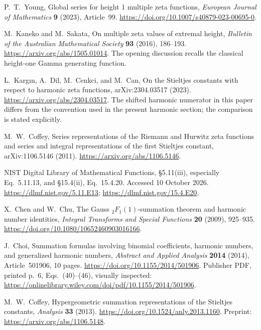 P.~T.~Young,
Global series for height 1 multiple zeta functions,
\emph{European Journal of Mathematics} \textbf{9} (2023), Article~99.
\url{https://doi.org/10.1007/s40879-023-00695-0}.

M.~Kaneko and M.~Sakata,
On multiple zeta values of extremal height,
\emph{Bulletin of the Australian Mathematical Society}
\textbf{93} (2016), 186--193.
\url{https://arxiv.org/abs/1505.01014}.
The opening discussion recalls the classical height-one Gamma
generating function.

L.~Karg\i n, A.~Dil, M.~Cenkci, and M.~Can,
On the Stieltjes constants with respect to harmonic zeta functions,
arXiv:2304.03517 (2023).
\url{https://arxiv.org/abs/2304.03517}.
The shifted harmonic numerator in this paper differs from the convention
used in the present harmonic section; the comparison is stated explicitly.

M.~W.~Coffey,
Series representations of the Riemann and Hurwitz zeta functions and
series and integral representations of the first Stieltjes constant,
arXiv:1106.5146 (2011).
\url{https://arxiv.org/abs/1106.5146}.

NIST Digital Library of Mathematical Functions,
\S5.11(iii), especially Eq.~5.11.13, and \S15.4(ii), Eq.~15.4.20.
Accessed 10 October 2026.
\url{https://dlmf.nist.gov/5.11.E13};
\url{https://dlmf.nist.gov/15.4.E20}.

X.~Chen and W.~Chu,
The Gauss ${}_2F_1(1)$-summation theorem and harmonic number identities,
\emph{Integral Transforms and Special Functions} \textbf{20} (2009),
925--935.
\url{https://doi.org/10.1080/10652460903016166}.

J.~Choi,
Summation formulas involving binomial coefficients, harmonic numbers,
and generalized harmonic numbers,
\emph{Abstract and Applied Analysis} \textbf{2014} (2014), Article~501906,
10 pages.
\url{https://doi.org/10.1155/2014/501906}.
Publisher PDF, printed p.~6, Eqs.~(40)--(46), visually inspected:
\url{https://onlinelibrary.wiley.com/doi/pdf/10.1155/2014/501906}.

M.~W.~Coffey,
Hypergeometric summation representations of the Stieltjes constants,
\emph{Analysis} \textbf{33} (2013).
\url{https://doi.org/10.1524/anly.2013.1160}.
Preprint: \url{https://arxiv.org/abs/1106.5148}.
